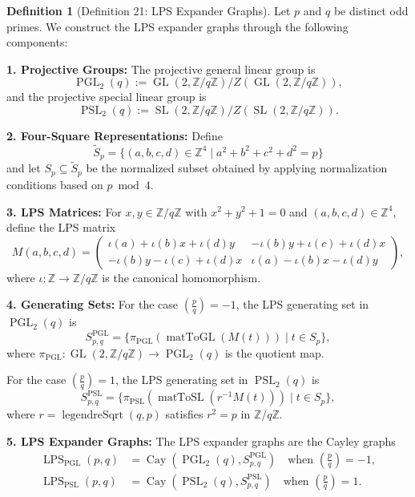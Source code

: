 \documentclass[11pt]{article}
\theoremstyle{plain}
\theoremstyle{definition}
\newtheorem*{definition}{Definition}
\theoremstyle{remark}
\begin{document}
\begin{definition}[Definition 21: LPS Expander Graphs]
Let $p$ and $q$ be distinct odd primes. We construct the LPS expander graphs through the following components:

\textbf{1. Projective Groups:} The projective general linear group is
\[
\operatorname{PGL}_2(q) := \operatorname{GL}(2, \mathbb{Z}/q\mathbb{Z}) / Z(\operatorname{GL}(2, \mathbb{Z}/q\mathbb{Z})),
\]
and the projective special linear group is 
\[
\operatorname{PSL}_2(q) := \operatorname{SL}(2, \mathbb{Z}/q\mathbb{Z}) / Z(\operatorname{SL}(2, \mathbb{Z}/q\mathbb{Z})).
\]

\textbf{2. Four-Square Representations:} Define
\[
\widetilde{S}_p = \{(a,b,c,d) \in \mathbb{Z}^4 \mid a^2 + b^2 + c^2 + d^2 = p\}
\]
and let $S_p \subseteq \widetilde{S}_p$ be the normalized subset obtained by applying normalization conditions based on $p \bmod 4$.

\textbf{3. LPS Matrices:} For $x, y \in \mathbb{Z}/q\mathbb{Z}$ with $x^2 + y^2 + 1 = 0$ and $(a,b,c,d) \in \mathbb{Z}^4$, define the LPS matrix
\[
M(a,b,c,d) = \begin{pmatrix}
\iota(a) + \iota(b)x + \iota(d)y & -\iota(b)y + \iota(c) + \iota(d)x \\
-\iota(b)y - \iota(c) + \iota(d)x & \iota(a) - \iota(b)x - \iota(d)y
\end{pmatrix},
\]
where $\iota : \mathbb{Z} \to \mathbb{Z}/q\mathbb{Z}$ is the canonical homomorphism.

\textbf{4. Generating Sets:} For the case $\left(\frac{p}{q}\right) = -1$, the LPS generating set in $\operatorname{PGL}_2(q)$ is
\[
S_{p,q}^{\operatorname{PGL}} = \{\pi_{\operatorname{PGL}}(\operatorname{matToGL}(M(t))) \mid t \in S_p\},
\]
where $\pi_{\operatorname{PGL}} : \operatorname{GL}(2,\mathbb{Z}/q\mathbb{Z}) \to \operatorname{PGL}_2(q)$ is the quotient map.

For the case $\left(\frac{p}{q}\right) = 1$, the LPS generating set in $\operatorname{PSL}_2(q)$ is
\[
S_{p,q}^{\operatorname{PSL}} = \{\pi_{\operatorname{PSL}}(\operatorname{matToSL}(r^{-1}M(t))) \mid t \in S_p\},
\]
where $r = \operatorname{legendreSqrt}(q,p)$ satisfies $r^2 = p$ in $\mathbb{Z}/q\mathbb{Z}$.

\textbf{5. LPS Expander Graphs:} The LPS expander graphs are the Cayley graphs
\begin{align}
\operatorname{LPS}_{\operatorname{PGL}}(p,q) &= \operatorname{Cay}(\operatorname{PGL}_2(q), S_{p,q}^{\operatorname{PGL}}) \quad \text{when } \left(\frac{p}{q}\right) = -1, \\
\operatorname{LPS}_{\operatorname{PSL}}(p,q) &= \operatorname{Cay}(\operatorname{PSL}_2(q), S_{p,q}^{\operatorname{PSL}}) \quad \text{when } \left(\frac{p}{q}\right) = 1.
\end{align}
\end{definition}
\end{document}
